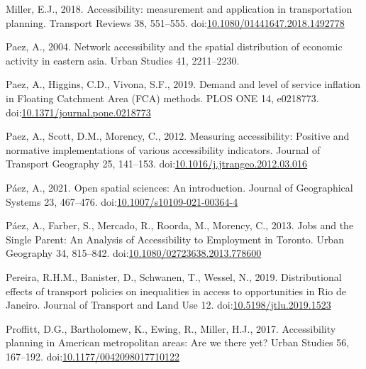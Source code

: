 \documentclass[]{elsarticle} %
\newlength{\cslhangindent}
\newlength{\cslentryspacingunit} %
\newenvironment{CSLReferences}[2] %
 {%
  \setlength{\parindent}{0pt}
  \ifodd #1
  \let\oldpar\par
  \def\par{\hangindent=\cslhangindent\oldpar}
  \fi
  \setlength{\parskip}{#2\cslentryspacingunit}
 }%
 {}
\begin{document}
\begin{CSLReferences}{1}{0}
\leavevmode{}%
Miller, E.J., 2018. Accessibility: measurement and application in
transportation planning. Transport Reviews 38, 551--555.
doi:\href{https://doi.org/10.1080/01441647.2018.1492778}{10.1080/01441647.2018.1492778}

\leavevmode{}%
Paez, A., 2004. Network accessibility and the spatial distribution of
economic activity in eastern asia. Urban Studies 41, 2211--2230.

\leavevmode{}%
Paez, A., Higgins, C.D., Vivona, S.F., 2019. Demand and level of service
inflation in Floating Catchment Area (FCA) methods. PLOS ONE 14,
e0218773.
doi:\href{https://doi.org/10.1371/journal.pone.0218773}{10.1371/journal.pone.0218773}

\leavevmode{}%
Paez, A., Scott, D.M., Morency, C., 2012. Measuring accessibility:
Positive and normative implementations of various accessibility
indicators. Journal of Transport Geography 25, 141--153.
doi:\href{https://doi.org/10.1016/j.jtrangeo.2012.03.016}{10.1016/j.jtrangeo.2012.03.016}

\leavevmode{}%
Páez, A., 2021. Open spatial sciences: An introduction. Journal of
Geographical Systems 23, 467--476.
doi:\href{https://doi.org/10.1007/s10109-021-00364-4}{10.1007/s10109-021-00364-4}

\leavevmode{}%
Páez, A., Farber, S., Mercado, R., Roorda, M., Morency, C., 2013. Jobs
and the {Single} {Parent}: {An} {Analysis} of {Accessibility} to
{Employment} in {Toronto}. Urban Geography 34, 815--842.
doi:\href{https://doi.org/10.1080/02723638.2013.778600}{10.1080/02723638.2013.778600}

\leavevmode{}%
Pereira, R.H.M., Banister, D., Schwanen, T., Wessel, N., 2019.
Distributional effects of transport policies on inequalities in access
to opportunities in {Rio} de {Janeiro}. Journal of Transport and Land
Use 12.
doi:\href{https://doi.org/10.5198/jtlu.2019.1523}{10.5198/jtlu.2019.1523}

\leavevmode{}%
Proffitt, D.G., Bartholomew, K., Ewing, R., Miller, H.J., 2017.
Accessibility planning in American metropolitan areas: Are we there yet?
Urban Studies 56, 167--192.
doi:\href{https://doi.org/10.1177/0042098017710122}{10.1177/0042098017710122}


\end{CSLReferences}
\end{document}

